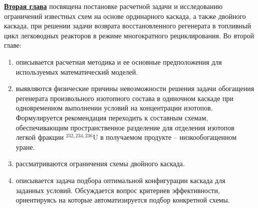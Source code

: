 \underline{\textbf{Вторая глава}} посвящена постановке расчетной задачи и исследованию ограничений известных схем на основе ординарного каскада, а также двойного каскада, при решении задачи возврата восстановленного регенерата в топливный цикл легководных реакторов в режиме многократного рециклирования.
Во второй главе:
\begin{enumerate}
  \item описывается расчетная методика и ее основные предположения для используемых математический моделей.
  \item выявляются физические причины невозможности решения задачи обогащения регенерата произвольного изотопного состава в одиночном каскаде при одновременном выполнении условий на  концентрации изотопов. Формулируется рекомендация переходить к составным схемам, обеспечивающим пространственное разделение для отделения изотопов легкой фракции $^{232,234,236}$U в получаемом продукте -- низкообогащенном уране.
  \item рассматриваются ограничения схемы двойного каскада.
  \item описывается задача подбора оптимальной конфигурации каскада для заданных условий. Обсуждается вопрос критериев эффективности, ориентируясь на которые автоматизируется подбор конкретной схемы.
\end{enumerate}


